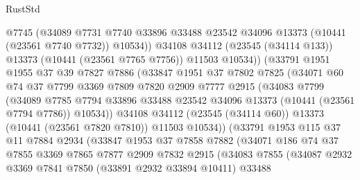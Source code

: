 \begin{lexlean}{RustStd}
\begin{coremodule}
                    @7745
                    (@34089
                      @7731
                      @7740
                      @33896
                      @33488
                      @23542
                      @34096
                      @13373
                      (@10441 (@23561 @7740 @7732))
                      @10534))
                  @34108
                  @34112
                  (@23545 (@34114 @133))
                  @13373
                  (@10441 (@23561 @7765 @7756))
                  @11503
                  @10534))
              (@33791
                @1951
                @1955
                @37
                @39
                @7827
                @7886
                (@33847
                  @1951
                  @37
                  @7802
                  @7825
                  (@34071
                    @60
                    @74
                    @37
                    @7799
                    @3369
                    @7809
                    @7820
                    @2909
                    @7777
                    @2915
                    (@34083
                      @7799
                      (@34089
                        @7785
                        @7794
                        @33896
                        @33488
                        @23542
                        @34096
                        @13373
                        (@10441 (@23561 @7794 @7786))
                        @10534))
                    @34108
                    @34112
                    (@23545 (@34114 @60))
                    @13373
                    (@10441 (@23561 @7820 @7810))
                    @11503
                    @10534))
                (@33791
                  @1953
                  @115
                  @37
                  @11
                  @7884
                  @2934
                  (@33847
                    @1953
                    @37
                    @7858
                    @7882
                    (@34071
                      @186
                      @74
                      @37
                      @7855
                      @3369
                      @7865
                      @7877
                      @2909
                      @7832
                      @2915
                      (@34083
                        @7855
                        (@34087
                          @2932
                          @3369
                          @7841
                          @7850
                          (@33891 @2932 @33894 @10411)
                          @33488

\end{coremodule}
\end{lexlean}

